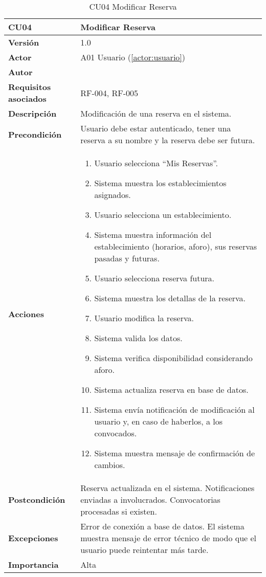 \begin{table}[H]
	\centering
	\begin{tabularx}{\linewidth}{ p{} p{} }
		\toprule
		\textbf{CU04}    & \textbf{Modificar Reserva} \\
		\toprule
		\textbf{Versión}              & 1.0    \\
		\textbf{Actor}                & A01 Usuario (\ref{actor:usuario}) \\
		\textbf{Autor}                & \nombre \\
		\textbf{Requisitos asociados} & RF-004, RF-005 \\
		\textbf{Descripción}          & Modificación de una reserva en el sistema. \\
		\textbf{Precondición}         & Usuario debe estar autenticado, tener una reserva a su nombre y la reserva debe ser futura. \\
		\textbf{Acciones}             &
		\begin{enumerate}
			\def\labelenumi{\arabic{enumi}.}
			\tightlist
			\item Usuario selecciona ``Mis Reservas''.
            \item Sistema muestra los establecimientos asignados.
            \item Usuario selecciona un establecimiento.
            \item Sistema muestra información del establecimiento (horarios, aforo), sus reservas pasadas y futuras.
            \item Usuario selecciona reserva futura.
            \item Sistema muestra los detallas de la reserva.
            \item Usuario modifica la reserva.
            \item Sistema valida los datos.
            \item Sistema verifica disponibilidad considerando aforo.
            \item Sistema actualiza reserva en base de datos.
            \item Sistema envía notificación de modificación al usuario y, en caso de haberlos, a los convocados.
            \item Sistema muestra mensaje de confirmación de cambios.
		\end{enumerate}\\
		\textbf{Postcondición}        & Reserva actualizada en el sistema. Notificaciones enviadas a involucrados. Convocatorias procesadas si existen.\\
		\textbf{Excepciones}          & Error de conexión a base de datos. El sistema muestra mensaje de error técnico de modo que el usuario puede reintentar más tarde.\\
		\textbf{Importancia}          & Alta \\
		\bottomrule
	\end{tabularx}
	\caption{CU04 Modificar Reserva}
	\label{cu:modificar-reserva}
\end{table}

